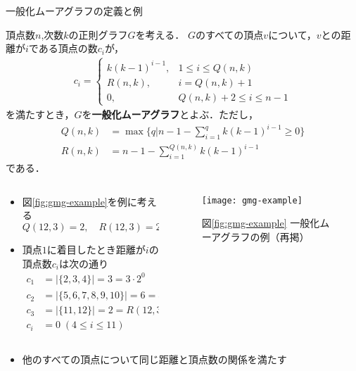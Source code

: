 \begin{frame}[allowframebreaks]{一般化ムーアグラフの定義と例}
  \begin{definition}\rm\scriptsize
    \label{def:generalized-moore-graph}
    頂点数$n$,次数$k$の正則グラフ$G$を考える．
    $G$のすべての頂点$v$について，$v$との距離が$i$である頂点の数$c_i$が，
    \[\begin{aligned}
      c_i =
      \begin{cases}
        k(k-1)^{i-1}, & 1\leq i\leq Q(n,k) \\
        R(n,k), & i = Q(n,k)+1 \\
        0, & Q(n,k)+2\leq i \leq n-1
      \end{cases}
    \end{aligned}\]
    を満たすとき，$G$を\textbf{一般化ムーアグラフ}とよぶ．ただし，\\
    \[\begin{aligned}
      Q(n,k)&=\max\{q|n-1-\sum_{i=1}^{q}k(k-1)^{i-1}\geq 0\}\\
      R(n,k)&=n-1-\sum_{i=1}^{Q(n,k)}k(k-1)^{i-1}
    \end{aligned}\]
    である．
  \end{definition}
  \framebreak
  \begin{columns}[c]
    \begin{column}{.5\textwidth}
      \begin{itemize}
      \item 図\ref{fig:gmg-example}を例に考える
        \[ Q(12,3) = 2,\quad R(12,3) = 2 \]
      \item 頂点$1$に着目したとき距離が$i$の頂点数$c_i$は次の通り
        \begin{align*}
          c_1&= |\{2,3,4\}| = 3 = 3\cdot2^0 \\
          c_2&= |\{5,6,7,8,9,10\}| = 6 = 3\cdot2^1 \\
          c_3&= |\{11,12\}| = 2 = R(12,3) \\
          c_i&= 0\;(4\leq i\leq11)
        \end{align*}\par
      \end{itemize}
    \end{column}
    \begin{column}{.5\textwidth}
      \begin{figure}
        \texttt{[image: gmg-example]}
        \caption*{
          {図\ref{fig:gmg-example}}
          一般化ムーアグラフの例（再掲）
        }
      \end{figure}
    \end{column}
  \end{columns}
  \vspace{.5em}
  \begin{itemize}
  \item 他のすべての頂点について同じ距離と頂点数の関係を満たす
  \end{itemize}
\end{frame}

